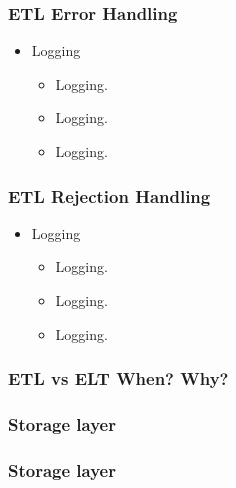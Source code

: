 
\begin{frame}
\frametitle{ETL Error Handling}
\begin{itemize}[<+->]
	\item Logging
	\begin{itemize}[<+->]
		\item  Logging.
		\item  Logging.
		\item  Logging.
		
		
	\end{itemize}
\end{itemize}
\end{frame}


\begin{frame}
\frametitle{ETL Rejection Handling}
\begin{itemize}[<+->]
	\item Logging
	\begin{itemize}[<+->]
		\item  Logging.
		\item  Logging.
		\item  Logging.
		
		
	\end{itemize}
\end{itemize}
\end{frame}


\begin{frame}
\frametitle{ETL vs ELT When? Why?}
\end{frame}

\subsubsection{Storage layer}

\begin{frame}
\frametitle{Storage layer}
\end{frame}
